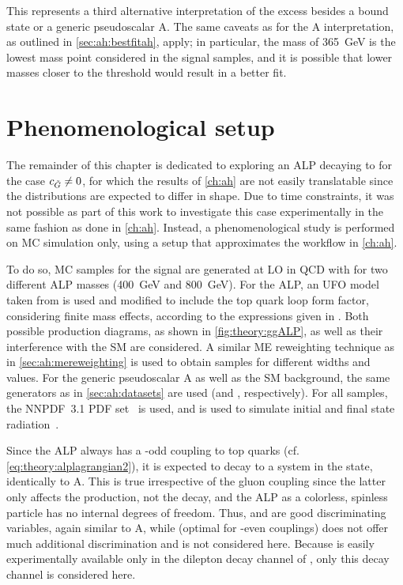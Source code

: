 This represents a third alternative interpretation of the excess besides a \ttbar bound state or a generic pseudoscalar A. The same caveats as for the A interpretation, as outlined in \cref{sec:ah:bestfitah}, apply; in particular, the mass of \SI{365}{\GeV} is the lowest mass point considered in the signal samples, and it is possible that lower masses closer to the \ttbar threshold would result in a better fit.

\section{Phenomenological setup}
\label{sec:alps:setup}

The remainder of this chapter is dedicated to exploring an ALP decaying to \ttbar for the case $c_{\tilde{G}} \neq 0$, for which the results of \cref{ch:ah} are not easily translatable since the distributions are expected to differ in shape. Due to time constraints, it was not possible as part of this work to investigate this case experimentally in the same fashion as done in \cref{ch:ah}. Instead, a phenomenological study is performed on MC simulation only, using a setup that approximates the workflow in \cref{ch:ah}.

To do so, MC samples for the signal are generated at LO in QCD with \amcatnlo for two different ALP masses (\SI{400}{\GeV} and \SI{800}{\GeV}). For the ALP, an UFO model taken from  is used and modified to include the top quark loop form factor, considering finite mass effects, according to the expressions given in . Both possible production diagrams, as shown in \cref{fig:theory:ggALP}, as well as their interference with the SM are considered. A similar ME reweighting technique as in \cref{sec:ah:mereweighting} is used to obtain samples for different widths and \cG values. For the generic pseudoscalar A as well as the SM \ttbar background, the same generators as in \cref{sec:ah:datasets} are used (\amcatnlo and \powhegvtwo \hvq, respectively). For all samples, the NNPDF~3.1 PDF set~\cite{NNPDF:2017mvq} is used, and  is used to simulate initial and final state radiation~\cite{Pythia:2015}.

Since the ALP always has a \CP-odd coupling to top quarks (cf. \cref{eq:theory:alplagrangian2}), it is expected to decay to a \ttbar system in the  state, identically to A. This is true irrespective of the gluon coupling \cG since the latter only affects the production, not the decay, and the ALP as a colorless, spinless particle has no internal degrees of freedom. Thus, \mtt and \chel are good discriminating variables, again similar to A, while \chan (optimal for \CP-even couplings) does not offer much additional discrimination and is not considered here. Because \chel is easily experimentally available only in the dilepton decay channel of \ttbar, only this decay channel is considered here.

